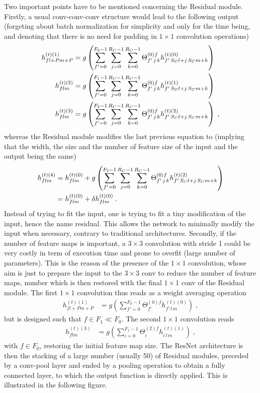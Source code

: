 \vspace{0.2cm}

Two important points have to be mentioned concerning the Residual module. Firstly, a usual conv-conv-conv structure would lead to the following output (forgeting about batch normalization for simplicity and only for the time being, and denoting that there is no need for padding in $1\times 1$ convolution operations)
\begin{align}
h^{(t)(1)}_{fl+Pm+P}&=
%
g\left(\sum^{F_0-1}_{f'=0}\sum^{R_C-1}_{j=0}\sum^{R_C-1}_{k=0}
%
\Theta^{(0)f}_{f'\,j\,k}h^{(t)(0)}_{f'\,S_Cl+j\,S_Cm+k}\right)\notag\\
%
h^{(t)(2)}_{flm}&=
%
g\left(\sum^{F_1-1}_{f'=0}\sum^{R_C-1}_{j=0}\sum^{R_C-1}_{k=0}
%
\Theta^{(0)f}_{f'\,j\,k}h^{(t)(1)}_{f'\,S_Cl+j\,S_Cm+k}\right)\notag\\
%
h^{(t)(3)}_{flm}&=
%
g\left(\sum^{F_2-1}_{f'=0}\sum^{R_C-1}_{j=0}\sum^{R_C-1}_{k=0}
%
\Theta^{(0)f}_{f'\,j\,k}h^{(t)(2)}_{f'\,S_Cl+j\,S_Cm+k}\right)\;,
\end{align}
whereas the Residual module modifies the last previous equation to (implying that the width, the size and the number of feature size of the input and the output being the same)
\begin{align}
h^{(t)(4)}_{flm}&=h^{(t)(0)}_{flm}+g\left(
%
\sum^{F_2-1}_{f'=0}\sum^{R_C-1}_{j=0}\sum^{R_C-1}_{k=0}
%
\Theta^{(0)f}_{f'\,j\,k}h^{(t)(2)}_{f'\,S_Cl+j\,S_Cm+k}\right)\notag\\
%
&=h^{(t)(0)}_{flm}+\delta h^{(t)(0)}_{flm}\;.
\end{align}
Instead of trying to fit the input, one is trying to fit a tiny modification of the input, hence the name residual. This allows the network to minimally modify the input when necessary, contrary to traditional architectures. Secondly, if the number of feature maps is important, a $3\times 3$ convolution with stride 1 could be very costly in term of execution time and prone to overfit (large number of parameters). This is the reason of the presence of the $1 \times 1$ convolution, whose aim is just to prepare the input to the $3\times 3$ conv to reduce the number of feature maps, number which is then restored with the final $1\times 1$ conv of the Residual module. The first $1\times 1$ convolution thus reads as a weight averaging operation 
\begin{align}
h^{(t)(1)}_{fl+Pm+P}&=
%
g\left(\sum^{F_0-1}_{f'=0}
%
\Theta^{(0)f}_{f'}h^{(t)(0)}_{f'\,l\,m}\right)\;,
\end{align}
but is designed such that $f\in F_1\ll F_0$. The second $1\times 1$ convolution reads
\begin{align}
h^{(t)(3)}_{flm}&=g\left(\sum^{F_1-1}_{i=0}\Theta^{(2)f}_{i}h^{(t)(1)}_{i\,l\,m}\right)\;,
\end{align}
with $f \in F_0$, restoring the initial feature map size. The ResNet architecture is then the stacking of a large number (usually 50) of Residual modules, preceded by a conv-pool layer and ended by a pooling operation to obtain a fully connected layer, to which the output function is directly applied. This is illustrated in the following figure.




